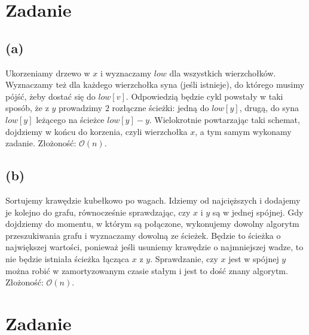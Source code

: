 \documentclass[12pt, a4paper]{article}
\newcommand{\MCALO}{\mathcal{O}}
\newcounter{zadanie}
\newcommand{\zadanie}{\addtocounter{zadanie}{1}\section*{Zadanie \arabic{zadanie}}}
\begin{document}
\zadanie{}
\subsection*{(a)}
Ukorzeniamy drzewo w $x$ i wyznaczamy $low$ dla wszystkich wierzchołków.
Wyznaczamy też dla każdego wierzchołka syna (jeśli istnieje), do którego musimy
pójść, żeby dostać się do $low[v]$. Odpowiedzią będzie cykl powstały w taki
sposób, że z $y$ prowadzimy $2$ rozłączne ścieżki: jedną do $low[y]$, drugą, do
syna $low[y]$ leżącego na ścieżce $low[y] - y$. Wielokrotnie powtarzając taki
schemat, dojdziemy w końcu do korzenia, czyli wierzchołka $x$, a tym samym
wykonamy zadanie. Złożoność: $\MCALO(n)$.

\subsection*{(b)}
Sortujemy krawędzie kubełkowo po wagach. Idziemy od najcięższych i dodajemy je
kolejno do grafu, równocześnie sprawdzając, czy $x$ i $y$ są w jednej spójnej.
Gdy dojdziemy do momentu, w którym są połączone, wykonujemy dowolny algorytm
przeszukiwania grafu i wyznaczamy dowolną ze ścieżek. Będzie to ścieżka
o największej wartości, ponieważ jeśli usuniemy krawędzie o najmniejszej wadze,
to nie będzie istniała ścieżka łącząca $x$ z $y$. Sprawdzanie, czy $x$ jest
w spójnej $y$ można robić w zamortyzowanym czasie stałym i jest to dość znany
algorytm. Złożoność: $\MCALO(n)$.

\zadanie{}
\end{document}
